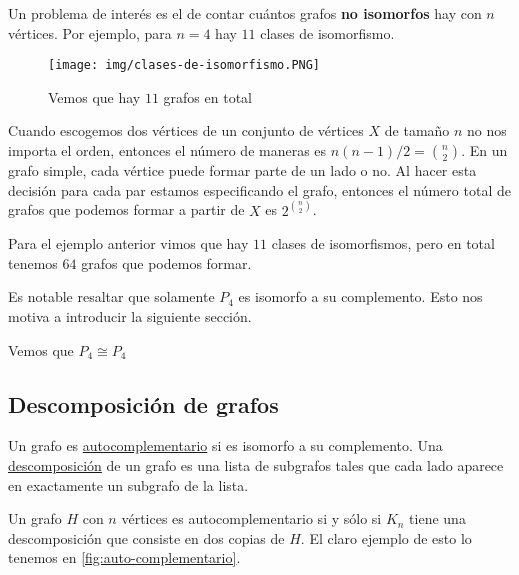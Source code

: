 \begin{ejem}
    Un problema de interés es el de contar cuántos grafos \textbf{no isomorfos} hay con $n$ vértices. Por ejemplo, para $n = 4$ hay $11$ clases de isomorfismo.

    \begin{figure}
        \centering
        \texttt{[image: img/clases-de-isomorfismo.PNG]}
        \caption{Vemos que hay $11$ grafos en total}
    \end{figure}
\end{ejem}

\begin{ejem}
    Cuando escogemos dos vértices de un conjunto de vértices $X$ de tamaño $n$ no nos importa el orden, entonces el número de maneras es $n(n-1)/2 = \binom{n}{2}$. En un grafo simple, cada vértice puede formar parte de un lado o no. Al hacer esta decisión para cada par estamos especificando el grafo, entonces el número total de grafos que podemos formar a partir de $X$ es $2^{\binom{n}{2}}$.
    
    Para el ejemplo anterior vimos que hay $11$ clases de isomorfismos, pero en total tenemos $64$ grafos que podemos formar.
    
    Es notable resaltar que solamente $P_4$ es isomorfo a su complemento. Esto nos motiva a introducir la siguiente sección.
\end{ejem}

\begin{marginfigure}
    \centering
    \caption{Vemos que $P_4 \cong P_4$}
    \label{fig:auto-complementario}
\end{marginfigure}

\subsection{Descomposición de grafos}

\begin{defn}
    Un grafo es \ul{autocomplementario} si es isomorfo a su complemento. Una \ul{descomposición} de un grafo es una lista de subgrafos tales que cada lado aparece en exactamente un subgrafo de la lista.
    
    Un grafo $H$ con $n$ vértices es autocomplementario si y sólo si $K_n$ tiene una descomposición que consiste en dos copias de $H$. El claro ejemplo de esto lo tenemos en \ref{fig:auto-complementario}.
\end{defn}

